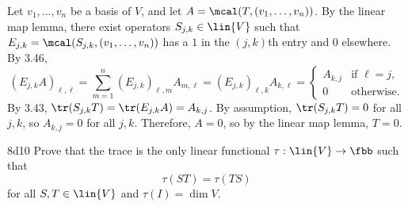 \begin{sol}
    Let $v_1, \ldots, v_n$ be a basis of $V$, and let $A = \mcal(T, (v_1, \ldots, v_n))$.
    By the linear map lemma, there exist operators $S_{j,k} \in \lin{V}$ such that $E_{j,k} = \mcal(S_{j,k}, (v_1, \ldots, v_n))$ has a $1$ in the $(j,k)$th entry and $0$ elsewhere.
    By 3.46,
    \[
        (E_{j,k} A)_{\ell, \ell}
        = \sum_{m=1}^n (E_{j,k})_{\ell, m} A_{m, \ell}
        = (E_{j,k})_{\ell, k} A_{k, \ell}
        = 
        \begin{cases}
            A_{k, j} & \text{if } \ell = j, \\
            0 & \text{otherwise}.
        \end{cases}
    \]
    By 3.43, $\tr(S_{j,k} T) = \tr(E_{j,k} A) = A_{k,j}$.
    By assumption, $\tr(S_{j,k} T) = 0$ for all $j,k$, so $A_{k,j} = 0$ for all $j,k$.
    Therefore, $A = 0$, so by the linear map lemma, $T = 0$.
\end{sol}

\begin{exercise}{8d10}
    Prove that the trace is the only linear functional $\tau : \lin{V} \to \fbb$ such that
    \[
        \tau(ST) = \tau(TS)
    \]
    for all $S, T \in \lin{V}$ and $\tau(I) = \dim V$.

\end{exercise}

